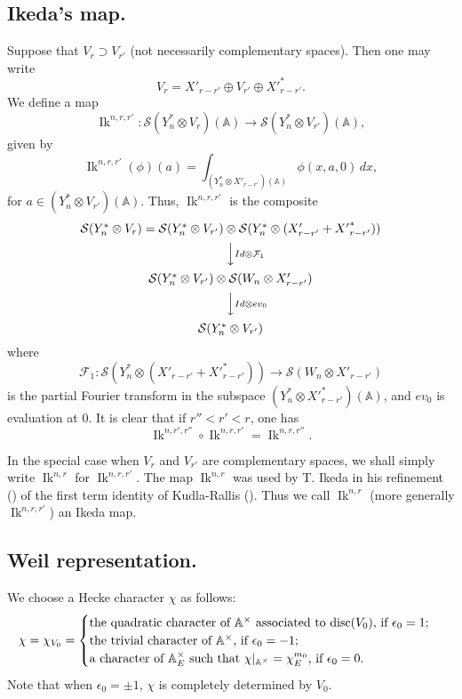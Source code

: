 \documentclass[10pt]{amsart}
\theoremstyle{plain}
\numberwithin{equation}{section}
\begin{document}
\subsection{\bf Ikeda's map.}
Suppose that  $V_r \supset V_{r'}$ (not necessarily complementary spaces).   
Then one may write
\[  V_r  =  X'_{r-r'} \oplus V_{r'} \oplus   {X'}^*_{r-r'}. \]
We define a map 
\[  {\operatorname{Ik}}^{n,r, r'}:  \mathcal{S}(Y_n^* \otimes V_r)({\mathbb{A}})\longrightarrow 
\mathcal{S}(Y_n^* \otimes V_{r'})({\mathbb{A}}), \]
given by
\[  {\operatorname{Ik}}^{n,r,r'}(\phi)(a) = \int_{(Y_n^* \otimes {X'_{r-r'}})({\mathbb{A}}) }  \phi( x, a, 0)  \, dx,\]
for $a \in (Y_n^* \otimes V_{r'})({\mathbb{A}})$.
 Thus, ${\operatorname{Ik}}^{n, r,r'}$ is the composite
 \[  \begin{CD}
 \mathcal{S}(Y_n^* \otimes V_r)
= \mathcal{S}(Y_n^* \otimes V_{r'})\otimes 
\mathcal{S}(Y_n^* \otimes (X'_{r-r'} + {X'}^*_{r-r'}))\\
 @VVId \otimes \mathcal{F}_1V \\
  \mathcal{S}(Y_n^* \otimes V_{r'})\otimes
  \mathcal{S}(W_n\otimes X'_{r-r'})\\
  @VVId \otimes ev_0V \\
  \mathcal{S}(Y_n^* \otimes V_{r'})
  \end{CD}
  \]
  where 
  \[  \mathcal{F}_1 : \mathcal{S}(Y_n^* \otimes (X'_{r-r'} +
  {X'}^*_{r-r'}))
\longrightarrow \mathcal{S}(W_n\otimes X'_{r-r'})\]
  is the partial Fourier transform in the subspace $(Y_n^* \otimes
  {X'}^*_{r-r'})({\mathbb{A}})$, and $ev_0$ is  evaluation at 0. It is clear that
  if $r'' < r' < r$, one has
  \begin{equation} \label{E:ikeda}
    {\operatorname{Ik}}^{n,r', r''} \circ {\operatorname{Ik}}^{n, r, r'}  = {\operatorname{Ik}}^{n, r, r''}. 
\end{equation}
  \vskip 5pt

  In the special case when  $V_r$ and $V_{r'}$ are complementary
  spaces, we shall simply write ${\operatorname{Ik}}^{n,r}$ for ${\operatorname{Ik}}^{n,r,r'}$. The
  map ${\operatorname{Ik}}^{n,r}$ was used by T. Ikeda in his refinement (\cite{Ik}) of the
  first term identity of Kudla-Rallis (\cite{KR5}). Thus we call
  ${\operatorname{Ik}}^{n,r}$ (more generally ${\operatorname{Ik}}^{n,r,r'}$) an Ikeda map.
 
 \vskip 5pt
 
 \subsection{\bf Weil representation.}  \label{SS:weil}
 We choose a Hecke character $\chi$ as follows:
\[  
\chi = \chi_{V_0} = \begin{cases}
\text{the quadratic character of ${\mathbb{A}}^{\times}$ associated to
  ${{\rm disc}}(V_0)$,  if $\epsilon_0=1$;} \\
\text{the trivial character of ${\mathbb{A}}^{\times}$, if $\epsilon_0 = -1$;} \\
\text{a character of ${\mathbb{A}}^{\times}_E$ such that $\chi|_{{\mathbb{A}}^{\times}} =
  \chi_E^{m_0}$, if $\epsilon_0 = 0$.} \end{cases} 
\]
Note that when $\epsilon_0=\pm 1$, $\chi$ is completely determined
by $V_0$.
\vskip 5pt
\end{document}
